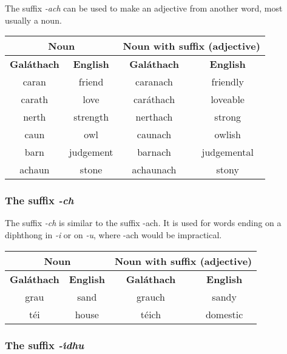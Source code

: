 The suffix \textit{-ach} can be used to make an adjective from another word, most usually a noun.
\begin{table}[H]
\centering
\begin{tabular}{cccc}
  \toprule
  \multicolumn{2}{c}{\textbf{Noun}} & \multicolumn{2}{c}{\textbf{Noun with suffix (adjective)}}\\
  \midrule
  \textbf{Gal\'{a}thach} & \textbf{English} & \textbf{Gal\'{a}thach} & \textbf{English}\\
  \cmidrule(lr){1-1}\cmidrule(lr){2-2}\cmidrule(lr){3-3}\cmidrule(lr){4-4}
  caran & friend & caranach & friendly\\
  carath & love & car\'{a}thach & loveable\\
  nerth & strength & nerthach & strong\\
  caun & owl & caunach & owlish\\
  barn & judgement & barnach & judgemental\\
  achaun & stone & achaunach & stony\\
  \bottomrule
\end{tabular}
\label{examples_suffix_ach}
\end{table}

\subsubsection{The suffix \textit{-ch}}
The suffix \textit{-ch} is similar to the suffix -ach. It is used for words ending on a diphthong in \textit{-i} or on \textit{-u}, where -ach would be impractical.
\begin{table}[H]
\centering
\begin{tabular}{cccc}
  \toprule
  \multicolumn{2}{c}{\textbf{Noun}} & \multicolumn{2}{c}{\textbf{Noun with suffix (adjective)}}\\
  \midrule
  \textbf{Gal\'{a}thach} & \textbf{English} & \textbf{Gal\'{a}thach} & \textbf{English}\\
  \cmidrule(lr){1-1}\cmidrule(lr){2-2}\cmidrule(lr){3-3}\cmidrule(lr){4-4}
  grau & sand & grauch & sandy\\
  t\'{e}i & house & t\'{e}ich & domestic\\
  \bottomrule
\end{tabular}
\label{examples_suffix_ch}
\end{table}

\subsubsection{The suffix \textit{-\'{\i}dhu}}

